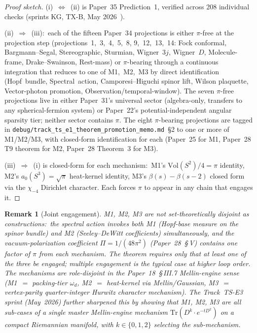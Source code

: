 \documentclass[11pt]{article}
\newtheorem{remark}{Remark}
\begin{document}
\begin{proof}[Proof sketch]
(i)~$\Leftrightarrow$~(ii) is Paper~35 Prediction~1, verified across
208 individual checks (sprints KG, TX-B, May 2026~\cite{paper35}).

(ii)~$\Rightarrow$~(iii):\ each of the fifteen Paper~34 projections is
either $\pi$-free at the projection step (projections~1,~3,~4,~5,~8,
9,~12,~13,~14: Fock conformal, Bargmann--Segal, Stereographic, Sturmian,
Wigner~$3j$, Wigner~$D$, Molecule-frame, Drake--Swainson, Rest-mass) or
$\pi$-bearing through a continuous integration that reduces to one of
M1,~M2,~M3 by direct identification (Hopf~bundle, Spectral~action,
Camporesi--Higuchi spinor lift, Wilson plaquette, Vector-photon promotion,
Observation/temporal-window).  The seven $\pi$-free projections live in
either Paper~31's universal sector (algebra-only, transfers to any
spherical-fermion system) or Paper~22's potential-independent angular
sparsity tier; neither sector contains $\pi$.  The eight $\pi$-bearing
projections are tagged in
\texttt{debug/track\_ts\_e1\_theorem\_promotion\_memo.md}~\S2 to one or
more of M1/M2/M3, with closed-form identification for each (Paper~25
for M1, Paper~28 T9 theorem for M2, Paper~28 Theorem~3 for M3).

(iii)~$\Rightarrow$~(i) is closed-form for each mechanism:\ M1's
$\mathrm{Vol}(S^2)/4 = \pi$ identity, M2's $a_0(S^3) = \sqrt{\pi}$
heat-kernel identity, M3's $\beta(s) - \beta(s-2)$ closed form via
the $\chi_{-4}$ Dirichlet character.  Each forces $\pi$ to appear in
any chain that engages it.
\end{proof}

\begin{remark}[Joint engagement]
M1, M2, M3 are not set-theoretically disjoint as constructions:\ the
spectral action invokes both M1 (Hopf-base measure on the spinor
bundle) and M2 (Seeley--DeWitt coefficients) simultaneously, and the
vacuum-polarization coefficient $\Pi = 1/(48\pi^2)$ (Paper~28~\S\,V)
contains one factor of $\pi$ from each mechanism.  The theorem requires
only that \emph{at least one} of the three be engaged; multiple
engagement is the typical case at higher loop order.  The mechanisms
are role-disjoint in the Paper~18~\S\,III.7 Mellin-engine sense
(M1~$=$ packing-tier $\omega_d$, M2~$=$ heat-kernel via Mellin/Gaussian,
M3~$=$ vertex-parity quarter-integer Hurwitz character mechanism).
The Track~TS-E3 sprint (May~2026) further sharpened this by showing
that M1, M2, M3 are all sub-cases of a single master Mellin-engine
mechanism $\mathrm{Tr}(D^k \cdot e^{-tD^2})$ on a compact Riemannian
manifold, with $k \in \{0, 1, 2\}$ selecting the sub-mechanism.
\end{remark}
\end{document}
